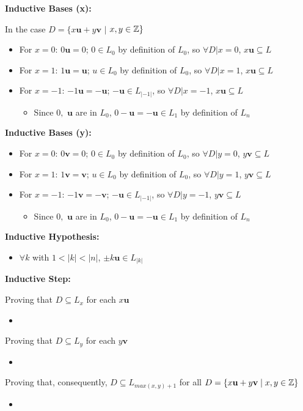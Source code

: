 \documentclass[11pt]{article}
\begin{document}
\begin{solution}[1]
\item
\textbf{Inductive Bases (x):} 
\item In the case $D = \{x\textbf{u} + y\textbf{v}$ $|$ $x, y \in \Z\}$
\begin{itemize}
\item For $x = 0$: $0\textbf{u} = 0$; $0 \in L_0$ by definition of $L_0$, so $\forall D| x = 0$, $x\textbf{u} \subseteq L$
\item For $x = 1$: $1\textbf{u} = \textbf{u}$; $u \in L_0$ by definition of $L_0$, so $\forall D| x = 1$, $x\textbf{u} \subseteq L$
\item For $x = -1$: $-1\textbf{u} = -\textbf{u}$; $-\textbf{u} \in L_{|-1|}$, so $\forall D| x = -1$, $x\textbf{u} \subseteq L$
\begin{itemize}
\item Since $0,$ $\textbf{u}$ are in $L_0$, $0-\textbf{u} = -\textbf{u} \in L_1$ by definition of $L_n$
\end{itemize} 
\end{itemize}
\textbf{Inductive Bases (y):} 
\begin{itemize}
\item For $x = 0$: $0\textbf{v} = 0$; $0 \in L_0$ by definition of $L_0$, so $\forall D| y = 0$, $y\textbf{v} \subseteq L$
\item For $x = 1$: $1\textbf{v} = \textbf{v}$; $u \in L_0$ by definition of $L_0$, so $\forall D| y = 1$, $y\textbf{v} \subseteq L$
\item For $x = -1$: $-1\textbf{v} = -\textbf{v}$; $-\textbf{u} \in L_{|-1|}$, so $\forall D| y = -1$, $y\textbf{v} \subseteq L$
\begin{itemize}
\item Since $0,$ $\textbf{u}$ are in $L_0$, $0-\textbf{u} = -\textbf{u} \in L_1$ by definition of $L_n$
\end{itemize} 
\end{itemize}
\textbf{Inductive Hypothesis:}
\begin{itemize}
\item $\forall k$ with $ 1 < |k| < |n|$, $\pm k\textbf{u} \in L_{|k|}$
\end{itemize}
\textbf{Inductive Step:}
\item Proving that $D \subseteq L_x$ for each $x\textbf{u}$
\begin{itemize}
\item 
\end{itemize}
\item Proving that $D \subseteq L_y$ for each $y\textbf{v}$
\begin{itemize}
\item 
\end{itemize}
\item Proving that, consequently, $D \subseteq L_{max(x,y) + 1}$ for all $D = \{ x{\bf u}+y{\bf
  v} \mid x,y \in \Z \}$ 
\begin{itemize}
\item 
\end{itemize}
\end{solution}
\end{document}
